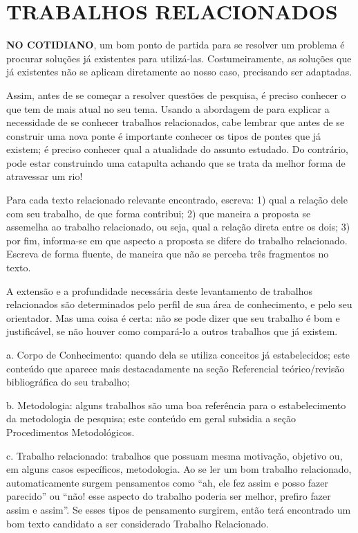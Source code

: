 \section{TRABALHOS RELACIONADOS}

\textbf{NO COTIDIANO}, um bom ponto de partida para se resolver um problema é procurar soluções já existentes para utilizá-las. Costumeiramente, as soluções que já existentes não se aplicam diretamente ao nosso caso, precisando ser adaptadas.

Assim, antes de se começar a resolver questões de pesquisa, é preciso conhecer o que tem de mais atual no seu tema.  Usando a abordagem de  para explicar a necessidade de se conhecer trabalhos relacionados, cabe lembrar que antes de se construir uma nova ponte é importante conhecer os tipos de pontes que já existem; é preciso conhecer qual a atualidade do assunto estudado. Do contrário, pode estar construindo uma catapulta achando que se trata da melhor forma de atravessar um rio!

Para cada texto relacionado relevante encontrado, escreva: 1) qual a relação dele com seu trabalho, de que forma contribui; 2) que maneira a proposta se assemelha ao trabalho relacionado, ou seja, qual a relação direta entre os dois; 3) por fim, informa-se em que aspecto a proposta se difere do trabalho relacionado. Escreva de forma fluente, de maneira que não se perceba três fragmentos no texto.

A extensão e a profundidade necessária deste levantamento de trabalhos relacionados são determinados pelo perfil de sua área de conhecimento, e pelo seu orientador. Mas uma coisa é certa: não se pode dizer que seu trabalho é bom e justificável, se não houver como compará-lo a outros trabalhos que já existem.

\begin{alineas}

\item[a.] Corpo de Conhecimento: quando dela se utiliza conceitos já estabelecidos; este conteúdo que aparece mais destacadamente na seção Referencial teórico/revisão bibliográfica do seu trabalho;

\item[b.] Metodologia: alguns trabalhos são uma boa referência para o estabelecimento da metodologia de pesquisa; este conteúdo em geral subsidia a seção Procedimentos Metodológicos.

\item[c.] Trabalho relacionado: trabalhos que possuam mesma motivação, objetivo ou, em alguns casos específicos, metodologia. Ao se ler um bom trabalho relacionado, automaticamente surgem pensamentos como “ah, ele fez assim e posso fazer parecido” ou “não! esse aspecto do trabalho poderia ser melhor, prefiro fazer assim e assim”.  Se esses tipos de pensamento surgirem, então terá encontrado um bom texto candidato a ser considerado Trabalho Relacionado.

\end{alineas}

